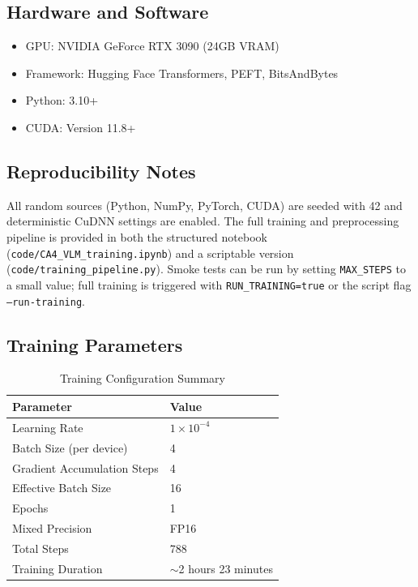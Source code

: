 \documentclass[conference]{IEEEtran}
\begin{document}
\subsection{Hardware and Software}

\begin{itemize}
    \item GPU: NVIDIA GeForce RTX 3090 (24GB VRAM)
    \item Framework: Hugging Face Transformers, PEFT, BitsAndBytes
    \item Python: 3.10+
    \item CUDA: Version 11.8+
\end{itemize}

\subsection{Reproducibility Notes}

All random sources (Python, NumPy, PyTorch, CUDA) are seeded with 42 and deterministic CuDNN settings are enabled. The full training and preprocessing pipeline is provided in both the structured notebook (\texttt{code/CA4\_VLM\_training.ipynb}) and a scriptable version (\texttt{code/training\_pipeline.py}). Smoke tests can be run by setting \texttt{MAX\_STEPS} to a small value; full training is triggered with \texttt{RUN\_TRAINING=true} or the script flag \texttt{--run-training}.

\subsection{Training Parameters}

\begin{table}[t]
\centering
\caption{Training Configuration Summary}
\begin{tabular}{l|l}
\toprule
Parameter & Value \\
\midrule
Learning Rate & $1 \times 10^{-4}$ \\
Batch Size (per device) & 4 \\
Gradient Accumulation Steps & 4 \\
Effective Batch Size & 16 \\
Epochs & 1 \\
Mixed Precision & FP16 \\
Total Steps & 788 \\
Training Duration & $\sim$2 hours 23 minutes \\
\bottomrule
\end{tabular}
\end{table}
\end{document}

